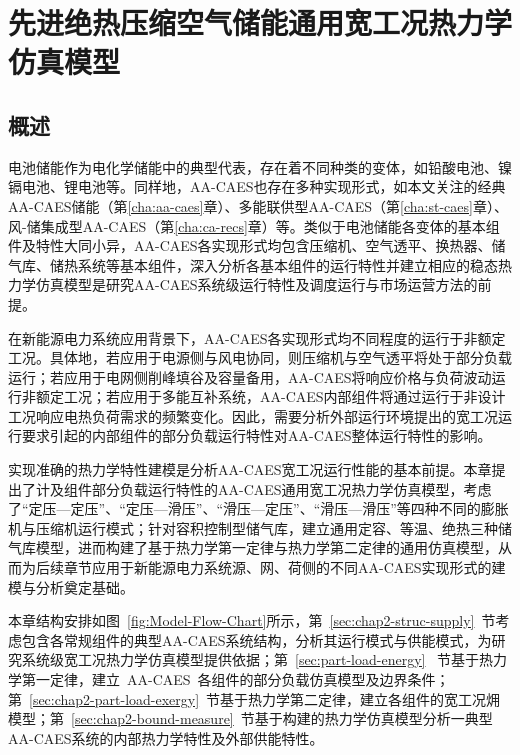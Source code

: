 \chapter{先进绝热压缩空气储能通用宽工况热力学仿真模型}
\label{cha:simulation}

\section{概述}
\label{sec:chap2-intro}

电池储能作为电化学储能中的典型代表，存在着不同种类的变体，如铅酸电池、镍镉电池、锂电池等\cite{Battery-Nature-15, ESS-Review-09}。同样地，AA-CAES也存在多种实现形式，如本文关注的经典AA-CAES储能（第\ref{cha:aa-caes}章）、多能联供型AA-CAES（第\ref{cha:st-caes}章）、风-储集成型AA-CAES（第\ref{cha:ca-recs}章）等。类似于电池储能各变体的基本组件及特性大同小异，AA-CAES各实现形式均包含压缩机、空气透平、换热器、储气库、储热系统等基本组件，深入分析各基本组件的运行特性并建立相应的稳态热力学仿真模型是研究AA-CAES系统级运行特性及调度运行与市场运营方法的前提。

在新能源电力系统应用背景下，AA-CAES各实现形式均不同程度的运行于非额定工况。具体地，若应用于电源侧与风电协同，则压缩机与空气透平将处于部分负载运行；若应用于电网侧削峰填谷及容量备用，AA-CAES将响应价格与负荷波动运行非额定工况；若应用于多能互补系统，AA-CAES内部组件将通过运行于非设计工况响应电热负荷需求的频繁变化。因此，需要分析外部运行环境提出的宽工况运行要求引起的内部组件的部分负载运行特性对AA-CAES整体运行特性的影响。

实现准确的热力学特性建模是分析AA-CAES宽工况运行性能的基本前提。本章提出了计及组件部分负载运行特性的AA-CAES通用宽工况热力学仿真模型，考虑了“定压—定压”、“定压—滑压”、“滑压—定压”、“滑压—滑压”等四种不同的膨胀机与压缩机运行模式；针对容积控制型储气库，建立通用定容、等温、绝热三种储气库模型，进而构建了基于热力学第一定律与热力学第二定律的通用仿真模型，从而为后续章节应用于新能源电力系统源、网、荷侧的不同AA-CAES实现形式的建模与分析奠定基础。

本章结构安排如图~\ref{fig:Model-Flow-Chart}所示，第~\ref{sec:chap2-struc-supply}~节考虑包含各常规组件的典型AA-CAES系统结构，分析其运行模式与供能模式，为研究系统级宽工况热力学仿真模型提供依据；第~\ref{sec:part-load-energy}~ 节基于热力学第一定律，建立~AA-CAES~各组件的部分负载仿真模型及边界条件；第~\ref{sec:chap2-part-load-exergy}~节基于热力学第二定律，建立各组件的宽工况㶲模型；第~\ref{sec:chap2-bound-measure}~节基于构建的热力学仿真模型分析一典型 AA-CAES系统的内部热力学特性及外部供能特性。

